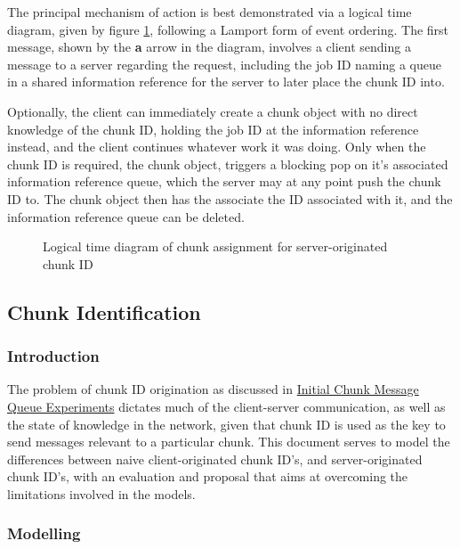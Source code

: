 The principal mechanism of action is best demonstrated via a logical time
diagram, given by figure \cref{fig:w-o-td}, following a Lamport form of
event ordering\cite{lamport1978ordering}.
The first message, shown by the \textbf{a} arrow in the diagram, involves a
client sending a message to a server regarding the request, including the job
ID naming a queue in a shared information reference for the server to later
place the chunk ID into.

Optionally, the client can immediately create a chunk object with no direct
knowledge of the chunk ID, holding the job ID at the information reference
instead, and the client continues whatever work it was doing.
Only when the chunk ID is required, the chunk object, triggers a blocking pop
on it's associated information reference queue, which the server may
at any point push the chunk ID to.
The chunk object then has the associate the ID associated with it, and the
information reference queue can be deleted.

\begin{figure}
	
	\caption{\label{fig:w-o-td}Logical time diagram of chunk assignment for
	server-originated chunk ID}
\end{figure}

\subsection{Chunk Identification}

\subsubsection{Introduction}

The problem of chunk ID origination as discussed in
\href{init-chunk-msg-q-exp.pdf}{Initial Chunk Message Queue Experiments}
dictates much of the client-server communication, as well as the state of
knowledge in the network, given that chunk ID is used as the key to send
messages relevant to a particular chunk.
This document serves to model the differences between naive client-originated
chunk ID's, and server-originated chunk ID's, with an evaluation and proposal
that aims at overcoming the limitations involved in the models.

\subsubsection{Modelling}\label{sec:cid-model}

